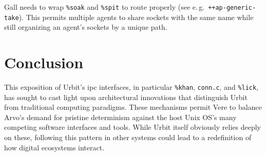 \documentclass[twoside]{article}
\begin{document}
Gall needs to wrap \lstinline[style=inlinecode]{%soak} and \lstinline[style=inlinecode]{%spit} to route properly (see e.\,g.\ \lstinline[style=inlinecode]{++ap-generic-take}).  This permits multiple agents to share sockets with the same name while still organizing an agent's sockets by a unique path.


\section{Conclusion}

\sloppy
This exposition of Urbit's {\sc ipc} interfaces, in particular \texttt{\%khan}, \texttt{conn.c}, and \texttt{\%lick}, has sought to cast light upon architectural innovations that distinguish Urbit from traditional computing paradigms.  These mechanisms permit Vere to balance Arvo's demand for pristine determinism against the host Unix OS's many competing software interfaces and tools.  While Urbit itself obviously relies deeply on these, following this pattern in other systems could lead to a redefinition of how digital ecosystems interact. \tombstone{}

\printbibliography
\end{document}
